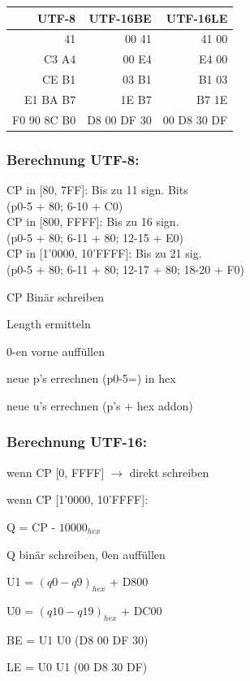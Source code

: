 \begin{multicols*}{5}
\begin{tabular}{c p{.82cm} | r | r}
\end{tabular}


\begin{tabular}{ r | r | r}
	\hline
	UTF-8&UTF-16BE&UTF-16LE\\
	\hline
	41&00 41&41 00 \\
	C3 A4&00 E4&E4 00\\
	CE B1&03 B1&B1 03\\
	E1 BA B7&1E B7&B7 1E\\
	F0 90 8C B0& D8 00 DF 30&00 D8 30 DF\\
\hline
	
\end{tabular}


\subsubsection{Berechnung UTF-8:}
CP in \textcolor{h}{[80, 7FF]:} Bis zu 11 sign. Bits\\
(p0-5 + 80; 6-10 + C0)\\
CP in \textcolor{h}{[800, FFFF]:} Bis zu 16 sign.\\
(p0-5 + 80; 6-11 + 80; 12-15 + E0)\\
CP in \textcolor{h}{[1'0000, 10'FFFF]:} Bis zu 21 sig.\\
(p0-5 + 80; 6-11 + 80; 12-17 + 80; 18-20 + F0)\\

\begin{compactenum}[1.]
	\item CP Binär schreiben
	\item Length ermitteln
	\item 0-en vorne auffüllen
	\item neue p's errechnen (p0-5=) in hex
	\item neue u's errechnen (p's + hex addon)
\end{compactenum}

\subsubsection{Berechnung UTF-16:}
\begin{compactenum}[1.]
	\item wenn CP [0, FFFF] $\rightarrow$ direkt schreiben
	\item wenn CP [1'0000, 10'FFFF]:
	\item Q = CP - $10000_{hex}$
	\item Q binär schreiben, 0en auffüllen
	\item U1 = $(q0-q9)_{hex}$ + D800
	\item U0 = $(q10-q19)_{hex}$ + DC00
	\item BE = U1 U0 (D8 00 DF 30)
	\item LE = U0 U1 (00 D8 30 DF)
\end{compactenum}








\end{multicols*}
